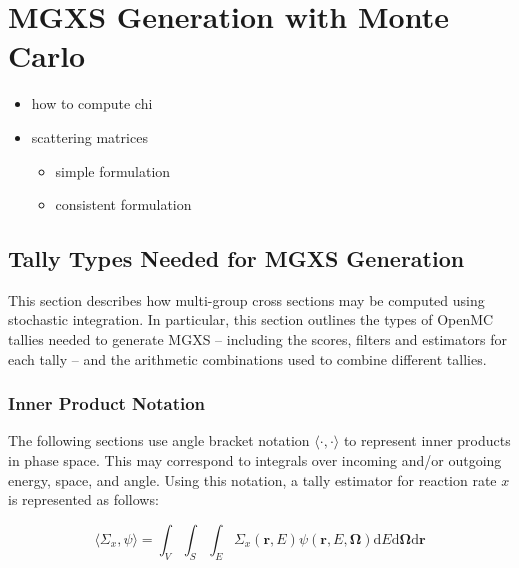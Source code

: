 \section{MGXS Generation with Monte Carlo}
\label{sec:mgxs-mc}

\begin{itemize}[noitemsep]
\item how to compute chi
\item scattering matrices
  \begin{itemize}
  \item simple formulation
  \item consistent formulation
  \end{itemize}
\end{itemize}


\subsection{Tally Types Needed for MGXS Generation}
\label{subsec:tally-types}

This section describes how multi-group cross sections may be computed using stochastic integration. In particular, this section outlines the types of OpenMC tallies needed to generate MGXS -- including the scores, filters and estimators for each tally -- and the arithmetic combinations used to combine different tallies.

\subsubsection{Inner Product Notation}
\label{subsubsec:tally-types-notation}

The following sections use angle bracket notation $\langle \cdot , \cdot \rangle$ to represent inner products in phase space. This may correspond to integrals over incoming and/or outgoing energy, space, and angle. Using this notation, a tally estimator for reaction rate $x$ is represented as follows: 

\begin{equation}
\label{eqn:inner-prod}
\langle \Sigma_x, \psi \rangle = \int_{V} \int_{S} \int_{E} \Sigma_{x}(\mathbf{r},E)\psi(\mathbf{r},E,\mathbf{\Omega}) \mathrm{d}E\mathrm{d}\mathbf{\Omega}\mathrm{d}\mathbf{r}
\end{equation}

